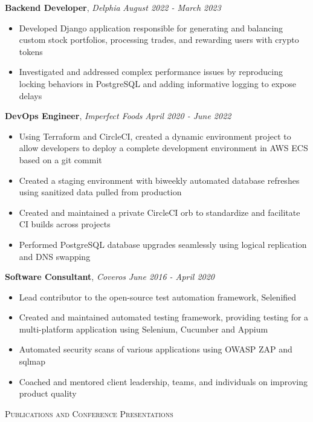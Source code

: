 \documentclass[9pt]{article}
\newenvironment{changemargin}[2]{%
  \begin{list}{}{%
    \setlength{\topsep}{0pt}%
    \setlength{\leftmargin}{#1}%
    \setlength{\rightmargin}{#2}%
    \setlength{\listparindent}{\parindent}%
    \setlength{\itemindent}{\parindent}%
    \setlength{\parsep}{\parskip}%
  }%
  \item[]}{\end{list}
}
\newcommand{\lineover}{
	\begin{changemargin}{-0.05in}{-0.05in}
		\vspace*{-8pt}
		\hrulefill \\
		\vspace*{-2pt}
	\end{changemargin}
}
\newcommand{\header}[1]{
	\begin{changemargin}{-0.5in}{-0.5in}
		\scshape{#1}\\
  	\lineover
	\end{changemargin}
}
\newenvironment{body} {
	\vspace*{-10pt}
	\begin{changemargin}{-0.25in}{-0.5in}
  }	
	{\end{changemargin}
}
\begin{document}
\begin{body}
	
	\vspace{14pt}
        \textbf{Backend Developer}, \emph{Delphia} \hfill \emph{August 2022 - March 2023}\\
	\vspace*{-4pt}
	\begin{itemize} \itemsep -0pt  %
		\item  Developed Django application responsible for generating and balancing custom stock portfolios, processing trades, and rewarding users with crypto tokens
        \item  Investigated and addressed complex performance issues by reproducing locking behaviors in PostgreSQL and adding informative logging to expose delays
	\end{itemize}
        \textbf{DevOps Engineer}, \emph{Imperfect Foods} \hfill \emph{April 2020 - June 2022}\\
	\vspace*{-4pt}
	\begin{itemize} \itemsep -0pt  %
		\item  Using Terraform and CircleCI, created a dynamic environment project to allow developers to deploy a complete development environment in AWS ECS based on a git commit
		\item  Created a staging environment with biweekly automated database refreshes using sanitized data pulled from production
		\item  Created and maintained a private CircleCI orb to standardize and facilitate CI builds across projects
		\item  Performed PostgreSQL database upgrades seamlessly using logical replication and DNS swapping
	\end{itemize}
	\textbf{Software Consultant}, \emph{Coveros} \hfill \emph{June 2016 - April 2020}\\
	\vspace*{-4pt}
	\begin{itemize} \itemsep -0pt  %
		\item  Lead contributor to the open-source test automation framework, Selenified
		\item  Created and maintained automated testing framework, providing testing for a multi-platform application using Selenium, Cucumber and Appium
		\item  Automated security scans of various applications using OWASP ZAP and sqlmap
		\item  Coached and mentored client leadership, teams, and individuals on improving product quality
	\end{itemize}
\end{body}
\vspace{10pt}	
\smallskip
\header{Publications and Conference Presentations}
\end{document}
